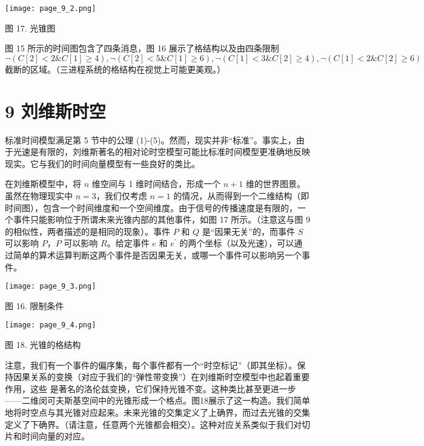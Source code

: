\documentclass[12pt,a4paper]{report} %
\begin{document}
  
\begin{center}
\texttt{[image: page\_9\_2.png]}
\end{center}
\begin{center}
图 17. 光锥图
\end{center}

 图 15 所示的时间图包含了四条消息，图 16 展示了格结构以及由四条限制 $\neg(C[2]<2 \& C[1] \geq 4), \neg(C[2]<5 \& C[1] \geq 6), \neg(C[1]<3 \& C[2] \geq 4), \neg(C[1]<2 \& C[2] \geq 6)$ 截断的区域。（三进程系统的格结构在视觉上可能更美观。）

\section*{9 刘维斯时空}

标准时间模型满足第 5 节中的公理 (1)-(5)。然而，现实并非“标准”。事实上，由于光速是有限的，刘维斯著名的相对论时空模型可能比标准时间模型更准确地反映现实。它与我们的时间向量模型有一些良好的类比。

在刘维斯模型中，将 $n$ 维空间与 1 维时间结合，形成一个 $n+1$ 维的世界图景。虽然在物理现实中 $n=3$，我们仅考虑 $n=1$ 的情况，从而得到一个二维结构（即时间图），包含一个时间维度和一个空间维度。由于信号的传播速度是有限的，一个事件只能影响位于所谓未来光锥内部的其他事件，如图 17 所示。（注意这与图 9 的相似性，两者描述的是相同的现象）。事件 $P$ 和 $Q$ 是“因果无关”的，而事件 $S$ 可以影响 $P$，$P$ 可以影响 $R$。给定事件 $e$ 和 $e^{\prime}$ 的两个坐标（以及光速），可以通过简单的算术运算判断这两个事件是否因果无关，或哪一个事件可以影响另一个事件。

\begin{center}
\texttt{[image: page\_9\_3.png]}
\end{center}
\begin{center}
图 16. 限制条件
\end{center}

  
\begin{center}
\texttt{[image: page\_9\_4.png]}
\end{center}
\begin{center}
图 18. 光锥的格结构
\end{center}

 注意，我们有一个事件的偏序集，每个事件都有一个“时空标记”（即其坐标）。保持因果关系的变换（对应于我们的“弹性带变换”）在刘维斯时空模型中也起着重要作用，这些
是著名的洛伦兹变换，它们保持光锥不变。这种类比甚至更进一步——二维闵可夫斯基空间中的光锥形成一个格点。图18展示了这一构造。我们简单地将时空点与其光锥对应起来。未来光锥的交集定义了上确界，而过去光锥的交集定义了下确界。（请注意，任意两个光锥都会相交）。这种对应关系类似于我们对切片和时间向量的对应。
\end{document}
